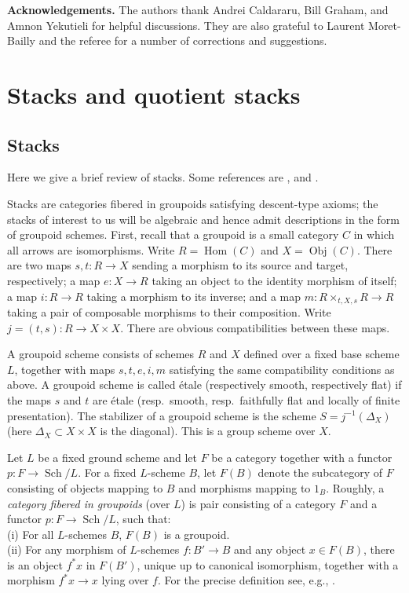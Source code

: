 \documentclass[12pt]{amsart}
\DeclareMathOperator{\Hom}{Hom}
\DeclareMathOperator{\Obj}{Obj}
\DeclareMathOperator{\Sch}{Sch}
\theoremstyle{plain}
\theoremstyle{definition}
\theoremstyle{remark}
\begin{document}
{\bf Acknowledgements.}
The authors thank Andrei Caldararu, Bill Graham, and
Amnon Yekutieli for helpful discussions. They are also
grateful to Laurent Moret-Bailly and the referee for
a number of corrections and suggestions.

\section{Stacks and quotient stacks} \label{s.stacks}


\subsection{Stacks}
Here we give a brief review of stacks. Some references
are \cite{D-M}, \cite{Vi} and \cite{L-MB}.

Stacks are categories fibered in groupoids satisfying descent-type
axioms; the stacks of interest to us will be algebraic and hence
admit descriptions in the form of groupoid schemes.
First, recall that a groupoid is
a small category $C$ in which all arrows are isomorphisms.
Write $R = \Hom(C)$ and $X = \Obj(C)$.  There are two maps $s,t\colon R
\rightarrow X$ sending a morphism to its source and target,
respectively; a map $e\colon X \rightarrow R$ taking an object to the
identity morphism of itself; a map $i\colon R \rightarrow R$ taking a
morphism to its inverse; and a map $m\colon R \times_{t,X,s} R\rightarrow R$
taking a pair of composable morphisms to their composition.
Write $j = (t,s)\colon R \rightarrow X \times X$.
There are obvious compatibilities between these maps.

A groupoid scheme consists of schemes $R$ and $X$ defined
over a fixed base scheme $L$, together with maps
$s,t,e,i,m$ satisfying the same compatibility conditions as above.
A groupoid scheme is called \'etale (respectively smooth, respectively
flat) if the maps $s$ and $t$ are
\'etale (resp.\ smooth, resp.\ faithfully flat
and locally of finite presentation).  
The stabilizer of a groupoid scheme is the scheme $S =
j^{-1}(\Delta_X)$ (here $\Delta_X \subset X \times X$ is the
diagonal).  This is a group scheme over $X$.

Let $L$ be a fixed ground scheme and let $F$ 
be a category together with a functor $p\colon F \rightarrow \Sch/L$.
For a fixed $L$-scheme $B$, let $F(B)$ denote the subcategory of $F$
consisting of objects mapping to $B$ and morphisms mapping to $1_B$.
Roughly,  a {\it category fibered in groupoids} (over
$L$) is pair consisting of a category $F$ and a
functor $p\colon F\rightarrow \Sch/L$, such that: \\
(i) For all $L$-schemes $B$, $F(B)$ is a groupoid. \\
(ii) 
For any morphism of $L$-schemes $f\colon B' \rightarrow B$
and any object $x \in F(B)$,
there is an object $f^*x$ in $F(B')$, unique up to canonical isomorphism,
together with a morphism $f^*x \rightarrow x$ lying over $f$.
For the precise definition see, e.g., \cite[Sec.\ 4]{D-M}.
\end{document}
